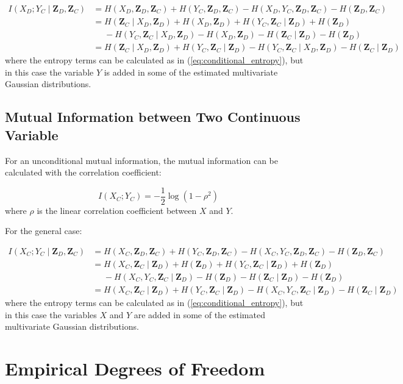 \documentclass[12pt]{article}
\newcommand{\zd}{\mathbf{Z}_D}
\newcommand{\zc}{\mathbf{Z}_C}
\newcommand{\z}{\mathbf{Z}_D, \mathbf{Z}_C}
\begin{document}
\begin{equation}
\begin{aligned}
I(X_D; Y_C \mid \z) & = H(X_D, \z) + H(Y_C, \z) - H(X_D, Y_C, \z) - H(\z)\\
& = H(\zc \mid X_D, \zd) + H(X_D, \zd) + H(Y_C, \zc\mid \zd) + H(\zd)\\
&\phantom{ = }{}- H(Y_C, \zc \mid X_D, \zd) - H(X_D, \zd) - H(\zc \mid \zd) - H(\zd)\\
& = H(\zc \mid X_D, \zd) + H(Y_C, \zc\mid \zd) - H(Y_C, \zc \mid X_D, \zd) - H(\zc \mid \zd)
\end{aligned}
\end{equation}
where the entropy terms can be calculated as in (\ref{eq:conditional_entropy}), but in this case the variable $Y$ is added in some of the estimated multivariate Gaussian distributions.

\subsection{Mutual Information between Two Continuous Variable}

For an unconditional mutual information, the mutual information can be calculated with the correlation coefficient:

\begin{equation}
I(X_C; Y_C) = -\frac{1}{2}\log\left(1-\rho^2\right)
\end{equation}
where $\rho$ is the linear correlation coefficient between $X$ and $Y$.

For the general case:

\begin{equation}
\begin{aligned}
I(X_C; Y_C \mid \z) & = H(X_C, \z) + H(Y_C, \z) - H(X_C, Y_C, \z) - H(\z)\\
& = H(X_C, \zc \mid \zd) + H(\zd) + H(Y_C, \zc\mid \zd) + H(\zd)\\
&\phantom{ = }{}- H(X_C, Y_C, \zc \mid \zd) - H(\zd) - H(\zc \mid \zd) - H(\zd)\\
& = H(X_C, \zc \mid \zd) + H(Y_C, \zc\mid \zd) - H(X_C, Y_C, \zc \mid \zd) - H(\zc \mid \zd)
\end{aligned}
\end{equation}
where the entropy terms can be calculated as in (\ref{eq:conditional_entropy}), but in this case the variables $X$ and $Y$ are added in some of the estimated multivariate Gaussian distributions.


\section{Empirical Degrees of Freedom}
\end{document}
